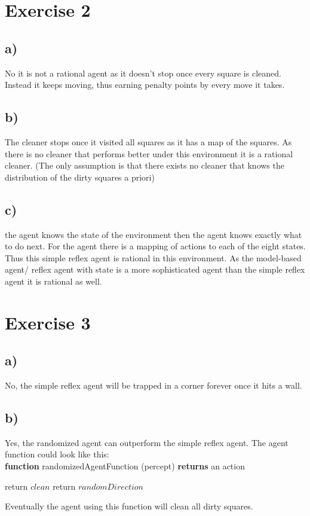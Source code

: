 \documentclass[11pt]{article}
\begin{document}
\section*{Exercise 2}
\subsection*{a)}
No it is not a rational agent as it doesn't stop once every square is cleaned. Instead it keeps moving, thus earning penalty points by every move it takes.

\subsection*{b)}
The cleaner stops once it visited all squares as it has a map of the squares. As there is no cleaner that performs better under this environment it is a rational cleaner. (The only assumption is that there exists no cleaner that knows the distribution of the dirty squares a priori)
 
\subsection*{c)}
the agent knows the state of the environment then the agent knows exactly what to do next. For the agent there is a mapping of actions to each of the eight states. Thus this simple reflex agent is rational in this environment.
As the model-based agent/ reflex agent with state is a more sophisticated agent than the simple reflex agent it is rational as well.


\newpage

\section*{Exercise 3}
\subsection*{a)}
No, the simple reflex agent will be trapped in a corner forever once it hits a wall.

\subsection*{b)}
Yes, the randomized agent can outperform the simple reflex agent.
The agent function could look like this: \\
\textbf{function} randomizedAgentFunction (percept) \textbf{returns} an action
\begin{algorithmic}
    \State return $clean$
\Else
    \State return $randomDirection$
\EndIf
\end{algorithmic}
Eventually the agent using this function will clean all dirty squares.
\end{document}
